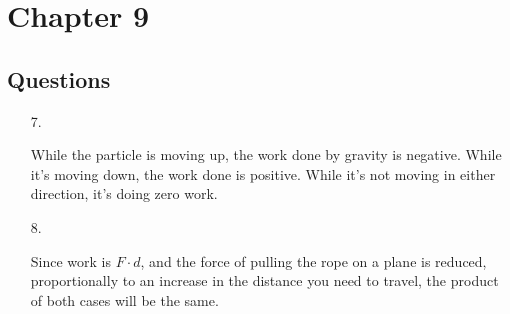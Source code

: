 


\renewcommand\assignment{HW 7, Due Friday, 3/10/2023 23:59; \S9 Q: \#7, 8 P: \#11, 18, 20, 22, 40 \S10 Q: \#4, 8 P: \#11, 15, 22}
\setlength{\belowdisplayskip}{0pt} \setlength{\belowdisplayshortskip}{0pt}
\setlength{\abovedisplayskip}{0pt} \setlength{\abovedisplayshortskip}{0pt}



    \iffalse
    \begin{equation*}
        \begin{gathered}
            Equations go here.
        \end{gathered}
    \end{equation*}

    \resizebox{\hsize}{!}{$Long equation goes here$}

    \begin{multicol*}{# of columns}
    \end{multicol*}

    \horizontal

    \fi


    \section*{Chapter 9}

    \subsection*{Questions}

    \begin{itemize}
        \item [7.]
        
            While the particle is moving up, the work done by gravity is negative. While it's moving down, the work done is positive. While it's not moving in either direction, it's doing zero work.

        \item [8.]
        
            Since work is $F \cdot d$, and the force of pulling the rope on a plane is reduced, proportionally to an increase in the distance you need to travel, the product of both cases will be the same.

    \end{itemize}

